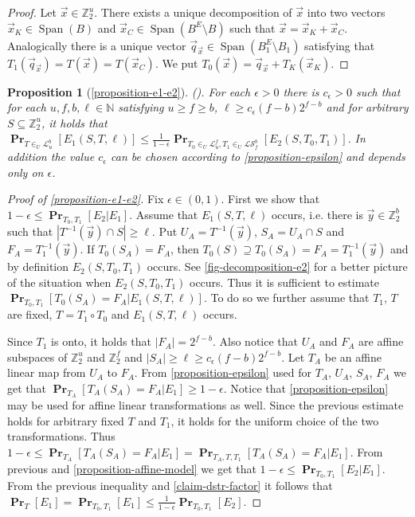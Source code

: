\documentclass[unicode,review]{siamart1116}
\newcommand{\vecspace}[2]{\mathbb{Z}_{#1}^{#2}}
\newcommand{\binvecspace}[1]{\vecspace{2}{#1}}
\newcommand{\linearmaps}[2]{\mathcal{L}_{#1}^{#2}}
\newcommand{\surjectivelinearmaps}[2]{\mathcal{LS}_{#1}^{#2}}
\newcommand{\probs}[2]{\operatorname{\mathbf{Pr}}_{{#1}}\left[{#2}\right]}
\newtheorem*{propositionrep*}{Proposition}
\numberwithin{theorem}{section}
\begin{document}
\begin{appendix}
\begin{proof}
Let $\vec{x} \in \binvecspace{u}$.
There exists a unique decomposition of $\vec{x}$ into two vectors $\vec{x}_K \in \operatorname{Span}(B)$ and $\vec{x}_C \in \operatorname{Span}(B^E \setminus B)$ such that $\vec{x} = \vec{x}_K + \vec{x}_C$.
Analogically there is a unique vector $\vec{q}_{\vec{x}} \in \operatorname{Span}(B_1^E \setminus B_1)$ satisfying that $T_1(\vec{q}_{\vec{x}}) = T(\vec{x}) = T(\vec{x}_C)$.
We put $T_0(\vec{x}) = \vec{q}_{\vec{x}} + T_K(\vec{x}_K)$.
\end{proof}

\begin{propositionrep*}[\cref{proposition-e1-e2}] \emph{({\cite[Proposition 3.2, p.~11]{alonetal}}).}
For each $\epsilon > 0$ there is $c_\epsilon > 0$ such that for each $u, f, b, \ell \in \mathbb{N}$ satisfying $u \geq f \geq b$, $\ell \geq c_\epsilon (f - b)2^{f-b}$ and for arbitrary $S \subseteq \binvecspace{u}$, it holds that
$
\probs{T \in_U \linearmaps{u}{b}}{E_1(S, T, \ell)} \leq \frac{1}{1 - \epsilon}\probs{T_0 \in_U \linearmaps{u}{f}, T_1 \in_U \surjectivelinearmaps{f}{b}}{E_2(S, T_0, T_1)}.
$
In addition the value $c_\epsilon$ can be chosen according to \cref{proposition-epsilon} and depends only on $\epsilon$.
\end{propositionrep*}
\begin{proof}[Proof of \cref{proposition-e1-e2}]
Fix $\epsilon \in (0, 1)$.
First we show that $1 - \epsilon \leq \probs{T_0, T_1}{E_2 | E_1}$.
Assume that $E_1(S, T, \ell)$ occurs, i.e. there is $\vec{y} \in \binvecspace{b}$ such that $|T^{-1}(\vec{y}) \cap S| \geq \ell$.
Put $U_A = T^{-1}(\vec{y})$, $S_A = U_A \cap S$ and $F_A = T_1^{-1}(\vec{y})$.
If $T_0(S_A) = F_A$, then $T_0(S) \supseteq T_0(S_A) = F_A = T_1^{-1}(\vec{y})$ and by definition $E_2(S, T_0, T_1)$ occurs.
See \cref{fig-decomposition-e2} for a better picture of the situation when $E_2(S, T_0, T_1)$ occurs.
Thus it is sufficient to estimate $\probs{T_0, T_1}{T_0(S_A) = F_A | E_1(S, T, \ell)}$.
To do so we further assume that $T_1$, $T$ are fixed, $T = T_1 \circ T_0$ and $E_1(S, T, \ell)$ occurs.

Since $T_1$ is onto, it holds that $|F_A| = 2^{f-b}$.
Also notice that $U_A$ and $F_A$ are affine subspaces of $\binvecspace{u}$ and $\binvecspace{f}$ and $|S_A| \geq \ell \geq c_\epsilon (f - b)2^{f-b}$.
Let $T_A$ be an affine linear map from $U_A$ to $F_A$.
From \cref{proposition-epsilon} used for $T_A$, $U_A$, $S_A$, $F_A$ we get that $\probs{T_A}{T_A(S_A) = F_A | E_1} \geq 1 - \epsilon$.
Notice that \cref{proposition-epsilon} may be used for affine linear transformations as well.
Since the previous estimate holds for arbitrary fixed $T$ and $T_1$, it holds for the uniform choice of the two transformations. Thus $1 - \epsilon \leq \probs{T_A}{T_A(S_A) = F_A | E_1} = \probs{T_A, T, T_1}{T_A(S_A) = F_A | E_1}$.
From previous and \cref{proposition-affine-model} we get that $1 - \epsilon \leq \probs{T_0, T_1}{E_2 | E_1}$.
From the previous inequality and \cref{claim-dstr-factor} it follows that $\probs{T}{E_1} = \probs{T_0, T_1}{E_1} \leq \frac{1}{1-\epsilon}\probs{T_0, T_1}{E_2}$.
\end{proof}
\end{appendix}
\end{document}
